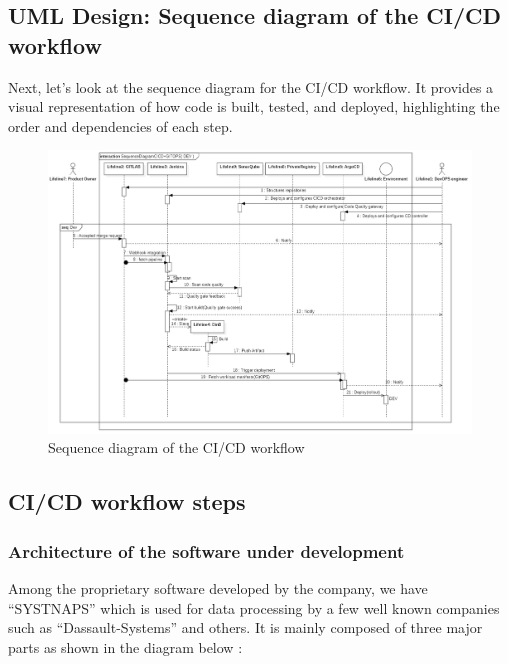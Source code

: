 \subsection{UML Design: Sequence diagram of the CI/CD workflow }
Next, let’s look at the sequence diagram for the CI/CD workflow. It provides a visual representation of how code is built, tested, and deployed, highlighting the order and dependencies of each step.
\begin{figure}[H]\centering
\begin{sideways}
\includegraphics[height=1.0\textwidth,angle=00]{assets/f46.png}
\end{sideways}
\caption{ Sequence diagram of the CI/CD workflow}
\label{fig:sequence diagram of the CI/CD workflow}
\end{figure}

\subsection{CI/CD workflow steps }

\subsubsection{Architecture of the software under development }

Among the proprietary software developed by the company, we have “SYSTNAPS” which is used for data processing by a few well known companies such as “Dassault-Systems” and others. It is mainly composed of three major parts as shown in the diagram below : 

